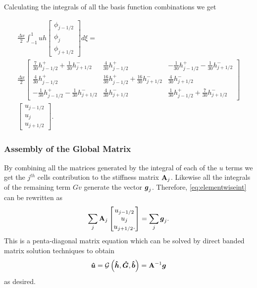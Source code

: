 Calculating the integrals of all the basis function combinations we get

\begin{multline}
\frac{\Delta x}{2}\int_{-1 }^{1}  uh \begin{bmatrix}
\phi_{j-1/2}\\\phi_j \\\phi_{j+1/2}
\end{bmatrix} d\xi =  \\  \frac{\Delta x}{2} \begin{bmatrix}
\frac{7}{30 } h^+_{j-1/2} + \frac{1}{30} h^-_{j+1/2} & \frac{4}{30 } h^+_{j-1/2}   & -\frac{1}{30 } h^+_{j-1/2} - \frac{1}{30} h^-_{j+1/2}\\\frac{4}{30 } h^+_{j-1/2} & \frac{16}{30 } h^+_{j-1/2} + \frac{16}{30} h^-_{j+1/2}&  \frac{4}{30} h^-_{j+1/2}\\ -\frac{1}{30 } h^+_{j-1/2} - \frac{1}{30} h^-_{j+1/2} &  \frac{4}{30 } h^-_{j+1/2} & \frac{1}{30 } h^+_{j-1/2} + \frac{7}{30} h^-_{j+1/2}
\end{bmatrix} \\  \begin{bmatrix}
u_{j-1/2}\\u_j \\u _{j+1/2}
\end{bmatrix}.
\end{multline}

\subsubsection{Assembly of the Global Matrix}
By combining all the matrices generated by the integral of each of the $u$ terms we get the $j^{th}$ cells contribution to the stiffness matrix $\mathbf{A}_j$. Likewise all the integrals of the remaining term $Gv$ generate the vector $\boldsymbol{g}_{j}$. Therefore, \eqref{eq:elementwiseint} can be rewritten as
\begin{equation}
\label{eqn:FEMElemMatrixJ}
\sum_j \mathbf{A}_j \begin{bmatrix}
u_{j-1/2}\\u_j \\u _{j+1/2}.
\end{bmatrix} = \sum_j \boldsymbol{g}_j.
\end{equation}
This is a penta-diagonal matrix equation which can be solved by direct banded matrix solution techniques to obtain
\begin{equation}
\boldsymbol{\hat{u}} =\mathcal{G}\left( \boldsymbol{\hat{h}}, \boldsymbol{\hat{G}},\boldsymbol{\hat{b}} \right) =   \mathbf{A}^{-1}\boldsymbol{g}
\label{eqn:usolvefromGhb}
\end{equation}
as desired.
